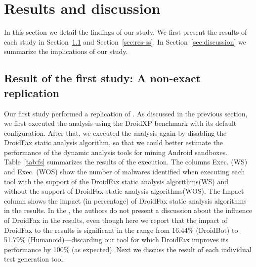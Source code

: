 \section{Results and discussion}

In this section we detail the findings of our study. We first present the results of each study
in Section~\ref{sec:res-fs} and Section~\ref{sec:res-ss}. In Section~\ref{sec:discussion} we summarize the
implications of our study. 

\subsection{Result of the first study: A non-exact replication}\label{sec:res-fs}

Our first study performed a replication of \blls.
As discussed in the previous section, we first executed the analysis using the DroidXP benchmark with its default configuration. After that, we executed the analysis again by disabling the DroidFax static analysis algorithm, so that we could better estimate the performance of the dynamic analysis tools for mining Android sandboxes. Table~\ref{tab:fs} summarizes the results of the execution. The columns Exec. (WS) and Exec. (WOS) 
show the number of malwares identified when executing each tool with the
support of the DroidFax static analysis algorithms(WS) and without the support
of DroidFax static analysis algorithms(WOS). 
The Impact column shows the impact
(in percentage) of DroidFax static analysis algorithms in the results.
In the \blls, the authors do not present a
discussion about the influence of DroidFax in the results, even
though here we report that the impact of DroidFax to the results is significant in the
range from 16.44\% (DroidBot) to 51.79\% (Humanoid)---discarding our
\joke tool for which DroidFax improves its performance by 100\% (as expected).
Next we discuss the result of each individual test generation tool. 

